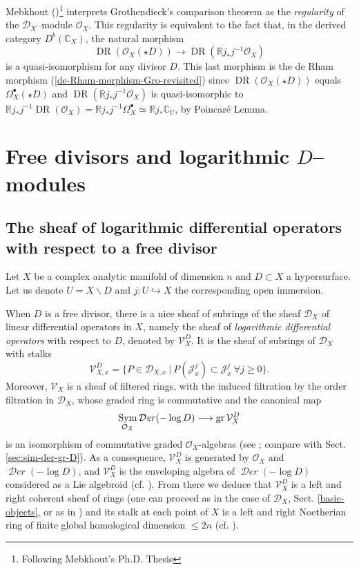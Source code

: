 \documentclass[12pt]{article}
\newcommand{\CC}{\mathbb{C}}
\newcommand{\RR}{\mathbb{R}}
\DeclareMathOperator{\gr}{\rm gr}
\DeclareMathOperator{\fDer}{\mathcal{D}\mathit{er}}
\DeclareMathOperator{\Sym}{{\rm Sym}}
\DeclareMathOperator{\DR}{DR}
\newcommand{\OO}{\mathcal{O}}
\newcommand{\DD}{\mathcal{D}}
\newcommand{\VV}{\mathcal{V}}
\newcommand{\cJ}{\mathcal{J}}
\newcommand{\cD}{\DD}
\newcommand{\cO}{\OO}
\newcommand\ssm{\smallsetminus}
\begin{document}
Mebkhout (\cite[Chap. 2, \S 2]{meb_formalisme})\footnote{Following Mebkhout's Ph.D. Thesis} interprets Grothendieck's comparison theorem as the {\em regularity} of the $\cD_X$--module $\cO_X$. This regularity is equivalent to the fact that, in the derived category $D^b(\CC_X)$,
the natural morphism $$\DR(\cO_X(\star D)) \rightarrow \DR(\RR j_*j^{-1} \cO_X)$$ is a quasi-isomorphism for any divisor $D$. This last morphism is the de Rham morphism (\ref{de-Rham-morphism-Gro-revisited}) since $\DR(\cO_X(\star D))$ equals $\Omega_X^\bullet(\star D)$ and $\DR(\RR j_*j^{-1} \cO_X)$ is quasi-isomorphic to $\RR j_*j^{-1} \DR(\cO_X) = \RR j_*j^{-1}\Omega^\bullet_X \simeq \RR j_* \CC_U$, by Poincar\'e Lemma.



\section{Free divisors and logarithmic $D$--modules}\label{sec:free-divisors-log-D-modules}

\subsection{The sheaf of logarithmic differential operators with respect to a free divisor}\label{sub:sheaf-V}

Let $X$ be a complex analytic manifold of dimension $n$ and $D\subset X$ a hypersurface.
Let us denote $U= X \ssm D$ and $j:U\hookrightarrow X$ the corresponding open immersion.

When $D$ is a free divisor, there is a nice sheaf of subrings of the sheaf $\DD_X$ of linear differential operators in $X$, namely the sheaf of {\em logarithmic differential operators} with respect to $D$, denoted by $\VV^D_X$. It is the
sheaf of subrings of $\DD_X$ with stalks
$$
\VV^D_{X,x} = \{P\in \DD_{X,x}\ |\ P(\cJ_x^j) \subset \cJ_x^j\ \forall j\geq 0\}.
$$
Moreover, $\VV_X$ is a sheaf of filtered rings, with the induced filtration by the order filtration in $\DD_X$, whose graded ring is commutative and the canonical map
\begin{equation} \label{eq:kappa-log}
\Sym_{\OO_X} \fDer(-\log D) \longrightarrow \gr \VV^D_X
\end{equation}
is an isomorphism of commutative graded $\OO_X$-algebras (see \cite[Cor. 2.1.6]{calde_ens}; compare with Sect. \ref{sec:sim-der-gr-D}). As a consequence, $\VV^D_X$
is generated by $\OO_X$ and $\fDer(-\log D)$, and $\VV^D_X$ is the enveloping algebra of $\fDer(-\log D)$ considered as a Lie algebroid (cf. \cite[\S (2.1)]{chem_99}). From there we deduce that $\VV^D_X$ is a left and right coherent sheaf of rings (one can proceed as in the case of $\DD_X$, Sect. \ref{basic-objects}, or as in \cite[Th. 1.2.5]{Bjork_AD}) and its stalk at each point of $X$ is a left and right Noetherian ring of finite global homological dimension $\leq 2n$ (cf. \cite[App. IV, Prop. 4.14 and Th. 5.1]{Bjork_AD}).
\end{document}
